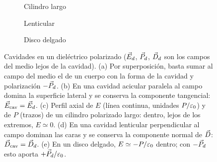 \begin{figure}[t]
\begin{subfigure}[b]{0.24\textwidth}
\caption{Cilindro largo}
\end{subfigure}\hfill
\begin{subfigure}[b]{0.235\textwidth}\centering
{}
\caption{Lenticular}
\end{subfigure}\hfill
\begin{subfigure}[b]{0.24\textwidth}\centering
{}
\caption{Disco delgado}
\end{subfigure}
\caption{Cavidades en un dieléctrico polarizado ($\vec E_d$, $\vec P_d$, $\vec D_d$ son los campos del medio lejos de la
cavidad). (a) Por superposición, basta sumar al campo del medio el de un cuerpo con la forma de la
cavidad y polarización $-\vec P_d$. (b) En una cavidad acicular paralela al campo domina la superficie
lateral y se conserva la componente tangencial: $\vec E_{\mathrm{cav}}=\vec E_d$. (c) Perfil axial de $E$ (línea continua,
unidades $P/\varepsilon_0$) y de $P$ (trazos) de un cilindro polarizado largo: dentro, lejos de los extremos, $E\simeq0$.
(d) En una cavidad lenticular perpendicular al campo dominan las caras y se conserva la componente
normal de $\vec D$: $\vec D_{\mathrm{cav}}=\vec D_d$. (e) En un disco delgado, $E\simeq-P/\varepsilon_0$ dentro; con $-\vec P_d$ esto aporta $+\vec P_d/\varepsilon_0$.}
\label{fig:cavidades}
\end{figure}
